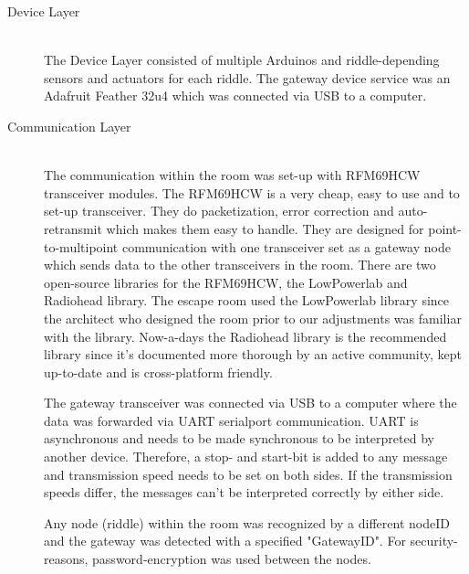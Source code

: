 \begin{description}
	\item[Device Layer]\hfill \\
	      The Device Layer consisted of multiple Arduinos and riddle-depending sensors and actuators for each riddle.
	      The gateway device service was an Adafruit Feather 32u4 which was connected via USB to a computer.
	\item[Communication Layer]\hfill \\
	      The communication within the room was set-up with RFM69HCW transceiver modules.\parencite{radiorange}
          The RFM69HCW is a very cheap, easy to use and to set-up transceiver. They do packetization, error correction and auto-retransmit which makes them easy to handle.
	      They are designed for point-to-multipoint communication with one transceiver set as a gateway node which sends data to the other transceivers in the room.
	      There are two open-source libraries for the RFM69HCW, the LowPowerlab \parencite{LowPowerLab} and Radiohead \parencite{radiohead} library.
	      The escape room used the LowPowerlab library since the architect who designed the room prior to our adjustments was familiar with the library.
          Now-a-days the Radiohead library is the recommended library \parencite{adafruitRecommends} since it's documented more thorough by an active community, kept up-to-date and is cross-platform friendly.
         
          The gateway transceiver was connected via USB to a computer where the data was forwarded via UART serialport communication.
        UART is asynchronous and needs to be made synchronous to be interpreted by another device. 
          Therefore, a stop- and start-bit is added to any message and transmission speed needs to be set on both sides.
          If the transmission speeds differ, the messages can't be interpreted correctly by either side.
            
          Any node (riddle) within the room was recognized by a different nodeID and the gateway was detected with a specified "GatewayID". 
            For security-reasons, password-encryption was used between the nodes. 


\end{description}
